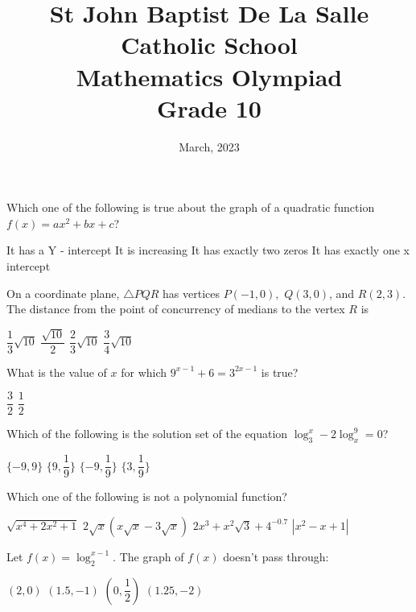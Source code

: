 \documentclass[12pt,addpoints]{exam}
\date{March, 2023}
\begin{document}
	\title{St John Baptist De La Salle Catholic School\\
		\large Mathematics Olympiad\\
		Grade 10}
	\maketitle
	\begin{questions}
		\question Which one of the following is true about the graph of a quadratic function $f(x)=ax^2+bx+c$?
		\begin{choices}
			\choice It has a Y - intercept
			\choice It is increasing
			\choice It has exactly two zeros
			\choice It has exactly one x intercept
		\end{choices}
		\question On a coordinate plane, $\triangle PQR$ has vertices $P(-1,0),$ $Q(3,0)$, and $R(2,3)$. The distance from the point of concurrency of medians to the vertex $R$ is \\ \begin{oneparchoices}
			\choice $\dfrac{1}{3}\sqrt{10}$
			\choice $\dfrac{\sqrt{10}}{2}$
			\choice $\dfrac{2}{3}\sqrt{10}$
			\choice $\dfrac{3}{4}\sqrt{10}$
		\end{oneparchoices}
		\question What is the value of $x$ for which $9^{x-1}+6=3^{2x-1}$ is true?\\ \begin{oneparchoices}
			\choice $\dfrac{3}{2}$
			\choice 1
			\choice $\dfrac{1}{2}$
			\choice 0
		\end{oneparchoices}
		\question Which of the following is the solution set of the equation $\log^x_3-2\log^9_x=0$? \\ \begin{oneparchoices}
			\choice $\{-9,9\}$
			\choice $\{9,\dfrac{1}{9}\}$
			\choice $\{-9,\dfrac{1}{9}\}$
			\choice $\{3,\dfrac{1}{9}\}$
		\end{oneparchoices}
		\question Which one of the following is not a polynomial function? \\ \begin{oneparchoices}
			\choice $\sqrt{x^4+2x^2+1}$
			\choice $2\sqrt{x}(x\sqrt{x}-3\sqrt{x})$
			\choice $2x^3+x^2\sqrt{3}+4^{-0.7}$
			\choice $|x^2-x+1|$
		\end{oneparchoices}
		\question Let $f(x)=\log^{x-1}_2$. The graph of $f(x)$ doesn't pass through: \\ \begin{oneparchoices}
			\choice $(2,0)$
			\choice $(1.5, -1)$
			\choice $(0,\dfrac{1}{2})$
			\choice $(1.25,-2)$

\end{oneparchoices}
\end{questions}
\end{document}
